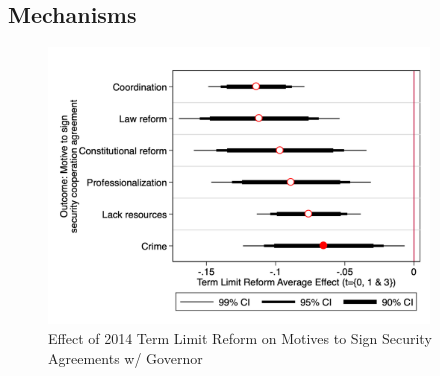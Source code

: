 \begin{appendix}

\clearpage

\subsection{Mechanisms}

\begin{figure}[H] 
\centering
 \caption{Effect of 2014 Term Limit Reform on Motives to Sign Security Agreements w/ Governor}
 \label{fig:motives}
\includegraphics[width=0.9\textwidth]{Figures/motives.png}
       \captionsetup{justification=centering}
\end{figure}   


\end{appendix}
